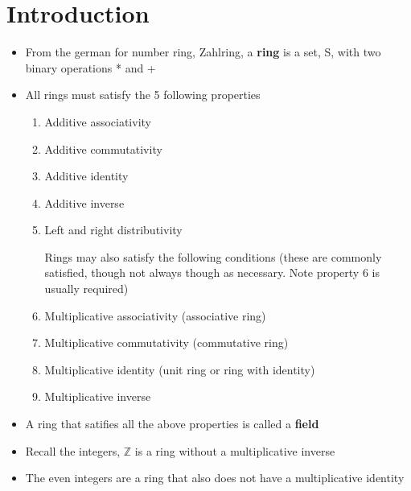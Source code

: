 \documentclass{article}
\begin{document}
\section{Introduction}
\begin{itemize}
    \item From the german for number ring, Zahlring, a \textbf{ring} is a set, S, with two binary operations * and +
    \item All rings must satisfy the 5 following properties
        \begin{enumerate}
            \item  Additive associativity
            \item Additive commutativity
            \item  Additive identity
            \item Additive inverse
            \item Left and right distributivity

     Rings may also satisfy the following conditions (these are commonly satisfied, though not always though as necessary. Note property 6 is usually required)
            \item Multiplicative associativity (associative ring)
            \item Multiplicative commutativity (commutative ring)
            \item Multiplicative identity (unit ring or ring with identity)
            \item Multiplicative inverse
        \end{enumerate}
    \item A ring that satifies all the above properties is called a \textbf{field}
    \item Recall the integers, $\mathbb{Z}$ is a ring without a multiplicative inverse
    \item The even integers are a ring that also does not have a multiplicative identity
\end{itemize}
\end{document}
